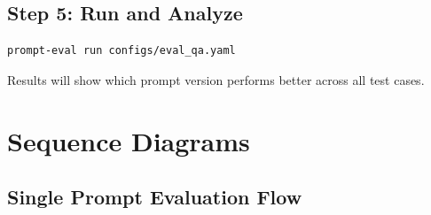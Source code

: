 \documentclass[11pt,a4paper]{report}
\begin{document}
\section{Step 5: Run and Analyze}

\begin{lstlisting}[style=bash]
prompt-eval run configs/eval_qa.yaml
\end{lstlisting}

Results will show which prompt version performs better across all test cases.


\chapter{Sequence Diagrams}

\section{Single Prompt Evaluation Flow}
\end{document}
